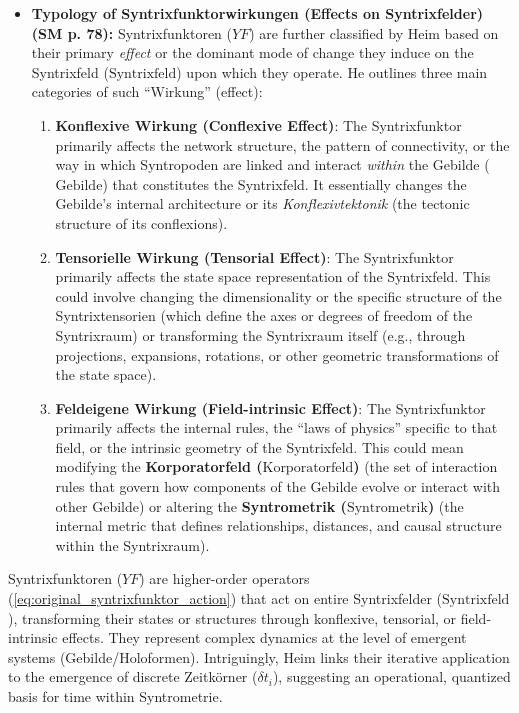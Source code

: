 \documentclass[12pt]{article}
\newcommand{\q}[1]{\enquote{#1}}
\newcommand{\syntrixfeld}{\text{Syntrixfeld}}
\newcommand{\syntrometrischesGebilde}{\text{Gebilde}}
\newcommand{\syntrometrik}{\text{Syntrometrik}}
\newcommand{\korporatorfeld}{\text{Korporatorfeld}}
\newcommand{\syntrixfunktor}{YF}
\newcommand{\zeitkorn}{\delta t_i}
\begin{document}
\begin{itemize}
    \item \textbf{Typology of Syntrixfunktorwirkungen (Effects on Syntrixfelder) (SM p. 78):}
    Syntrixfunktoren (\(\syntrixfunktor\)) are further classified by Heim based on their primary \textit{effect} or the dominant mode of change they induce on the Syntrixfeld (\(\syntrixfeld\)) upon which they operate. He outlines three main categories of such \q{Wirkung} (effect):
    \begin{enumerate}
        \item \textbf{Konflexive Wirkung (Conflexive Effect)}: The Syntrixfunktor primarily affects the network structure, the pattern of connectivity, or the way in which Syntropoden are linked and interact \textit{within} the Gebilde (\(\syntrometrischesGebilde\)) that constitutes the Syntrixfeld. It essentially changes the Gebilde’s internal architecture or its \textit{Konflexivtektonik} (the tectonic structure of its conflexions).
        \item \textbf{Tensorielle Wirkung (Tensorial Effect)}: The Syntrixfunktor primarily affects the state space representation of the Syntrixfeld. This could involve changing the dimensionality or the specific structure of the Syntrixtensorien (which define the axes or degrees of freedom of the Syntrixraum) or transforming the Syntrixraum itself (e.g., through projections, expansions, rotations, or other geometric transformations of the state space).
        \item \textbf{Feldeigene Wirkung (Field-intrinsic Effect)}: The Syntrixfunktor primarily affects the internal rules, the \q{laws of physics} specific to that field, or the intrinsic geometry of the Syntrixfeld. This could mean modifying the \textbf{Korporatorfeld (\(\korporatorfeld\))} (the set of interaction rules that govern how components of the Gebilde evolve or interact with other Gebilde) or altering the \textbf{Syntrometrik (\(\syntrometrik\))} (the internal metric that defines relationships, distances, and causal structure within the Syntrixraum).
    \end{enumerate}
\end{itemize}

Syntrixfunktoren (\(\syntrixfunktor\)) are higher-order operators (\eqref{eq:original_syntrixfunktor_action}) that act on entire Syntrixfelder (\(\syntrixfeld\)), transforming their states or structures through konflexive, tensorial, or field-intrinsic effects. They represent complex dynamics at the level of emergent systems (Gebilde/Holoformen). Intriguingly, Heim links their iterative application to the emergence of discrete Zeitkörner (\(\zeitkorn\)), suggesting an operational, quantized basis for time within Syntrometrie.
\end{document}
